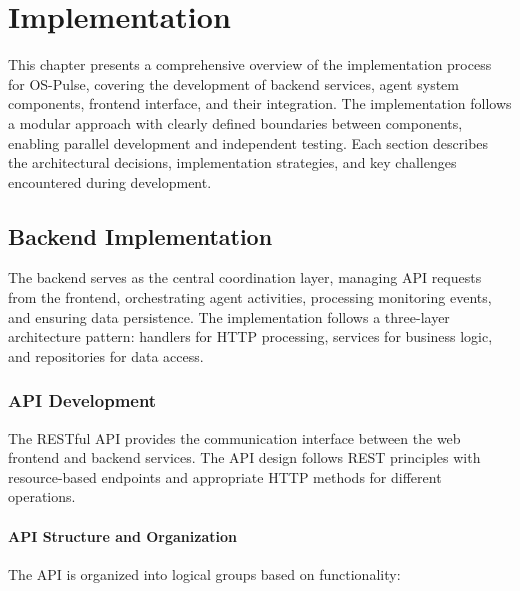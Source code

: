\chapter{Implementation}

This chapter presents a comprehensive overview of the implementation process for OS-Pulse, covering the development of backend services, agent system components, frontend interface, and their integration. The implementation follows a modular approach with clearly defined boundaries between components, enabling parallel development and independent testing. Each section describes the architectural decisions, implementation strategies, and key challenges encountered during development.

\section{Backend Implementation}

The backend serves as the central coordination layer, managing API requests from the frontend, orchestrating agent activities, processing monitoring events, and ensuring data persistence. The implementation follows a three-layer architecture pattern: handlers for HTTP processing, services for business logic, and repositories for data access.

\subsection{API Development}

The RESTful API provides the communication interface between the web frontend and backend services. The API design follows REST principles with resource-based endpoints and appropriate HTTP methods for different operations.

\subsubsection{API Structure and Organization}

The API is organized into logical groups based on functionality:

